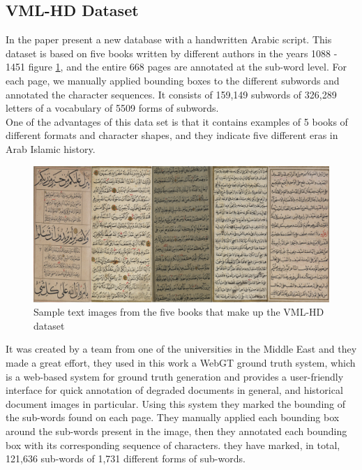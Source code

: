 \subsection{VML-HD Dataset}
In the paper \cite{VMLHD} present a new database with a handwritten Arabic script. This dataset is based on five books written by different authors in the years 1088 - 1451 figure \ref{fig:VML-HD sample dataset}, and the entire 668 pages are annotated at the sub-word level. For each page, we manually applied bounding boxes to the different subwords and annotated the character sequences. It consists of 159,149 subwords of 326,289 letters of a vocabulary of 5509 forms of subwords. \\
One of the advantages of this data set is that it contains examples of 5 books of different formats and character shapes, and they indicate five different eras in Arab Islamic history. \\

\begin{figure}[!htb]
    \centering
    \includegraphics[width=13cm]{images/vml-hd-sample.PNG}
    \caption{Sample text images from the five books that make up the VML-HD dataset}
    \label{fig:VML-HD sample dataset}
\end{figure}


It was created by a team from one of the universities in the Middle East and they made a great effort, they used in this work a WebGT ground truth system\cite{biller2013webgt}, which is a web-based system for ground truth generation and provides a user-friendly interface for quick annotation of degraded documents in general, and historical document images in particular. Using this system they marked the bounding of the sub-words found on each page. They manually applied each bounding box around the sub-words present in the image, then they annotated each bounding box with its corresponding sequence of characters. they have marked, in total, 121,636 sub-words of 1,731 different forms of sub-words\cite{VMLHD}. \\

